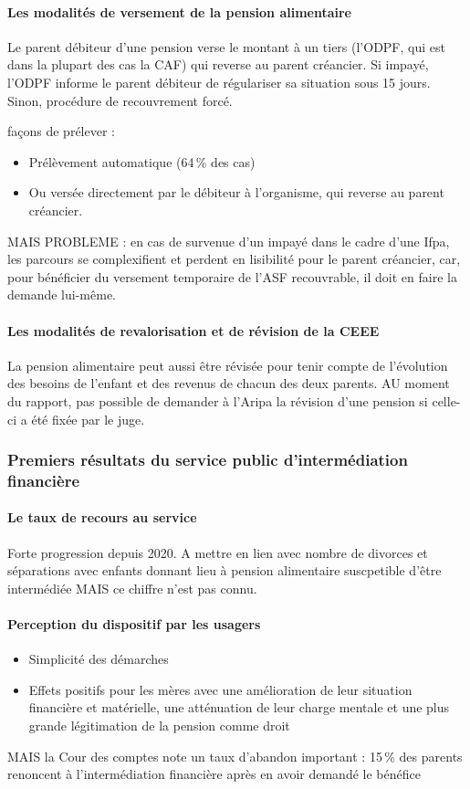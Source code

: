 \documentclass{article}
\begin{document}
\paragraph{Les modalités de versement de la pension alimentaire}
Le parent débiteur d'une pension verse le montant à un tiers (l'ODPF, qui est dans la plupart des cas la CAF) qui reverse au parent créancier. Si impayé, l'ODPF informe le parent débiteur de régulariser sa situation sous 15 jours. Sinon, procédure de recouvrement forcé.
 
\medskip
{} façons de prélever :
\begin{itemize}
    \item Prélèvement automatique (64\,\% des cas)
    \item Ou versée directement par le débiteur à l'organisme, qui reverse au parent créancier.
\end{itemize}
 
\medskip
\noindent MAIS PROBLEME : en cas de survenue d'un impayé dans le cadre d'une Ifpa, les parcours se complexifient et perdent en lisibilité pour le parent créancier, car, pour bénéficier du versement temporaire de l'ASF recouvrable, il doit en faire la demande lui-même.
 
\paragraph{Les modalités de revalorisation et de révision de la CEEE}
La pension alimentaire peut aussi être révisée pour tenir compte de l'évolution des besoins de l'enfant et des revenus de chacun des deux parents.
AU moment du rapport, pas possible de demander à l'Aripa la révision d'une pension si celle-ci a été fixée par le juge.
 
 
\subsubsection*{Premiers résultats du service public d'intermédiation financière}
 
\paragraph{Le taux de recours au service}
Forte progression depuis 2020. A mettre en lien avec nombre de divorces et séparations avec enfants donnant lieu à pension alimentaire suscpetible d'être intermédiée MAIS ce chiffre n'est pas connu.
 
\paragraph{Perception du dispositif par les usagers}
\begin{itemize}
    \item Simplicité des démarches
    \item Effets positifs pour les mères avec une amélioration de leur situation financière et matérielle, une atténuation de leur charge mentale et une plus grande légitimation de la pension comme droit
\end{itemize}
 
\medskip
\noindent MAIS la Cour des comptes note un taux d'abandon important : 15\,\% des parents renoncent à l'intermédiation financière après en avoir demandé le bénéfice
 
 
\end{document}
